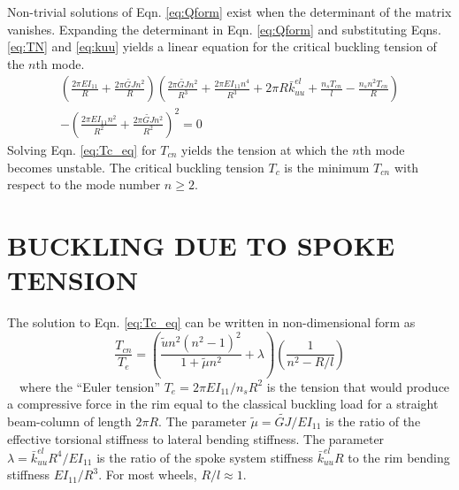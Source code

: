\documentclass{bmd2016p}
\begin{document}
Non-trivial solutions of Eqn. \ref{eq:Qform} exist when the determinant of the matrix vanishes. Expanding the determinant in Eqn. \ref{eq:Qform} and substituting Eqns. \ref{eq:TN} and \ref{eq:kuu} yields a linear equation for the critical buckling tension of the $n$th mode.
	\begin{multline}\label{eq:Tc_eq}
	\left(\frac{2\pi EI_{11}}{R}+\frac{2\pi \widetilde{GJ}n^2}{R} \right) \left( \frac{2\pi \widetilde{GJ}n^2}{R^3} + \frac{2\pi EI_{11}n^4}{R^3} + 2\pi R\bar{k}_{uu}^{el} + \frac{n_sT_{cn}}{l} - \frac{n_sn^2T_{cn}}{R}\right)\\
	- \left( \frac{2\pi EI_{11}n^2}{R^2} + \frac{2\pi \widetilde{GJ}n^2}{R^2} \right)^2 = 0
	\end{multline}
Solving Eqn. \ref{eq:Tc_eq} for $T_{cn}$ yields the tension at which the $n$th mode becomes unstable. The critical buckling tension $T_c$ is the minimum $T_{cn}$ with respect to the mode number $n\geq 2$.



\section{BUCKLING DUE TO SPOKE TENSION}
The solution to Eqn. \ref{eq:Tc_eq} can be written in non-dimensional form as
	\begin{equation}\label{eq:Tc_nondim}
	\frac{T_{cn}}{T_e} = \left( \frac{\tilde{u}n^2(n^2-1)^2}{1+\tilde{\mu}n^2} + \lambda \right) \left(\frac{1}{n^2-R/l} \right)
	\end{equation}
\,\,\,\, where the ``Euler tension'' $T_e=2\pi EI_{11}/n_sR^2$ is the tension that would produce a compressive force in the rim equal to the classical buckling load for a straight beam-column of length $2\pi R$. The parameter $\tilde{\mu} = \widetilde{GJ}/EI_{11}$ is the ratio of the effective torsional stiffness to lateral bending stiffness. The parameter $\lambda = \bar{k}_{uu}^{el}R^4/EI_{11}$ is the ratio of the spoke system stiffness $\bar{k}_{uu}^{el}R$ to the rim bending stiffness $EI_{11}/R^3$. For most wheels, $R/l\approx 1$.
\end{document}
